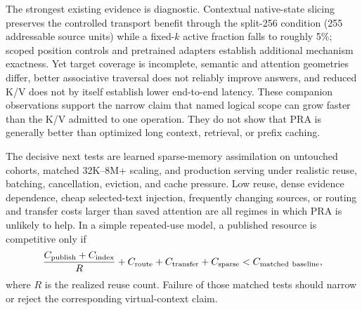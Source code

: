 \documentclass[11pt]{article}
\begin{document}
The strongest existing evidence is diagnostic. Contextual native-state slicing preserves the
controlled transport benefit through the split-256 condition (255 addressable source units) while a fixed-$k$ active fraction
falls to roughly 5\%; scoped position controls and pretrained adapters establish additional
mechanism exactness. Yet target coverage is incomplete, semantic and attention geometries differ,
better associative traversal does not reliably improve answers, and reduced K/V does not by
itself establish lower end-to-end latency. These companion observations support the narrow claim
that named logical scope can grow faster than the K/V admitted to one operation. They do not show
that PRA is generally better than optimized long context, retrieval, or prefix caching.

The decisive next tests are learned sparse-memory assimilation on untouched cohorts, matched
32K--8M+ scaling, and production serving under realistic reuse, batching, cancellation, eviction,
and cache pressure. Low reuse, dense evidence dependence, cheap selected-text injection,
frequently changing sources, or routing and transfer costs larger than saved attention are all
regimes in which PRA is unlikely to help. In a simple repeated-use model, a published resource is
competitive only if
\begin{equation}
\frac{C_{\rm publish}+C_{\rm index}}{R}+C_{\rm route}+C_{\rm transfer}+C_{\rm sparse}
< C_{\rm matched\ baseline},
\end{equation}
where $R$ is the realized reuse count. Failure of those matched tests should narrow or reject the
corresponding virtual-context claim.



\end{document}
